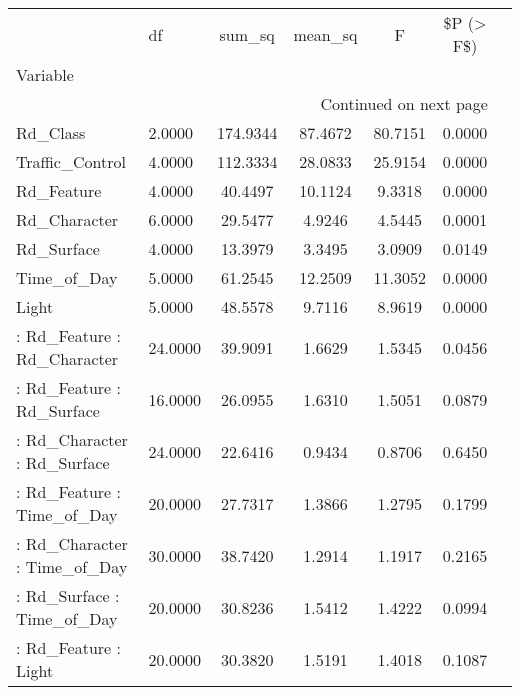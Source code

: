 \begin{longtable}{p{6cm}lccccc}
\toprule
{} &         df &     sum\_sq &  mean\_sq &       F &  \$P (> F\$) \\
Variable                                           &            &            &          &         &            \\
\midrule
\endhead
\midrule
\multicolumn{6}{r}{{Continued on next page}} \\
\midrule
\endfoot

\bottomrule
\endlastfoot
Rd\_Class                                           &     2.0000 &   174.9344 &  87.4672 & 80.7151 &     0.0000 \\
Traffic\_Control                                    &     4.0000 &   112.3334 &  28.0833 & 25.9154 &     0.0000 \\
Rd\_Feature                                         &     4.0000 &    40.4497 &  10.1124 &  9.3318 &     0.0000 \\
Rd\_Character                                       &     6.0000 &    29.5477 &   4.9246 &  4.5445 &     0.0001 \\
Rd\_Surface                                         &     4.0000 &    13.3979 &   3.3495 &  3.0909 &     0.0149 \\
Time\_of\_Day                                        &     5.0000 &    61.2545 &  12.2509 & 11.3052 &     0.0000 \\
Light                                              &     5.0000 &    48.5578 &   9.7116 &  8.9619 &     0.0000 \\
 : Rd\_Feature : Rd\_Character                       &    24.0000 &    39.9091 &   1.6629 &  1.5345 &     0.0456 \\
 : Rd\_Feature : Rd\_Surface                         &    16.0000 &    26.0955 &   1.6310 &  1.5051 &     0.0879 \\
 : Rd\_Character : Rd\_Surface                       &    24.0000 &    22.6416 &   0.9434 &  0.8706 &     0.6450 \\
 : Rd\_Feature : Time\_of\_Day                        &    20.0000 &    27.7317 &   1.3866 &  1.2795 &     0.1799 \\
 : Rd\_Character : Time\_of\_Day                      &    30.0000 &    38.7420 &   1.2914 &  1.1917 &     0.2165 \\
 : Rd\_Surface : Time\_of\_Day                        &    20.0000 &    30.8236 &   1.5412 &  1.4222 &     0.0994 \\
 : Rd\_Feature : Light                              &    20.0000 &    30.3820 &   1.5191 &  1.4018 &     0.1087 \\

\end{longtable}
